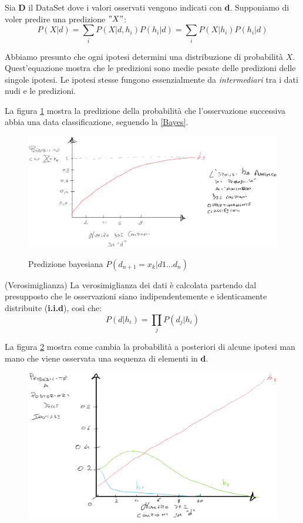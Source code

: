 \begin{definizione}
Sia \textbf{D} il DataSet dove i valori osservati vengono indicati con \textbf{d}. Supponiamo di voler predire una predizione $"X"$:
\begin{equation}
    P(X|d)=\sum_{i}P(X|d, h_i)P(h_i|d) = \sum_{i}P(X|h_i)P(h_i|d) 
    \label{Bayes}
\end{equation}
\begin{nota}
    Abbiamo presunto che ogni ipotesi determini una distribuzione di probabilità $X$. Quest'equazione mostra che le predizioni sono medie pesate delle predizioni delle singole ipotesi. Le ipotesi stesse fungono essenzialmente da \textit{intermediari} tra i dati nudi e le predizioni.
\end{nota}
\end{definizione}
La figura \ref{Fig:Prob2} mostra la predizione della probabilità che l'osservazione successiva abbia una data classificazione, seguendo la \ref{Bayes}. 
\begin{figure}[H]
    \centering
    \includegraphics[width=1\textwidth]{img/prob2.png}
    \label{Fig:Prob2}
    \caption{Predizione bayesiana $P(d_{n+1} = x_k | d1 \dots d_n)$}
\end{figure}
\begin{definizione}(Verosimiglianza)
  La verosimiglianza dei dati è calcolata partendo dal presupposto che le osservazioni siano indipendentemente e identicamente distribuite (\textbf{i.i.d}), così che:
  \[P(d|h_i)=\prod_{j}P(d_j|h_i)\]
\end{definizione}
La figura \ref{Fig:Prob1} mostra come cambia la probabilità a posteriori di alcune ipotesi man mano che viene osservata una sequenza di elementi in \textbf{d}.
\begin{figure}[H]
    \centering
    \includegraphics[width=1\textwidth]{img/prob1.png}
    \label{Fig:Prob1}
    \caption{}
\end{figure}
